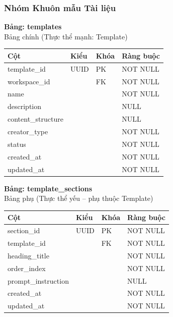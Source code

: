 \subsubsection{Nhóm Khuôn mẫu Tài liệu}

\textbf{Bảng: templates}\\
Bảng chính (Thực thể mạnh: Template)
\begin{table}[H]
\centering
\begin{tabular}{|l|l|l|l|}
\hline
\textbf{Cột} & \textbf{Kiểu} & \textbf{Khóa} & \textbf{Ràng buộc} \\ \hline
template\_id & UUID & PK & NOT NULL \\ \hline
workspace\_id & & FK & NOT NULL \\ \hline
name & & & NOT NULL \\ \hline
description & & & NULL \\ \hline
content\_structure & & & NULL \\ \hline
creator\_type & & & NOT NULL \\ \hline
status & & & NOT NULL \\ \hline
created\_at & & & NOT NULL \\ \hline
updated\_at & & & NOT NULL \\ \hline
\end{tabular}
\end{table}

\textbf{Bảng: template\_sections}\\
Bảng phụ (Thực thể yếu – phụ thuộc Template)
\begin{table}[H]
\centering
\begin{tabular}{|l|l|l|l|}
\hline
\textbf{Cột} & \textbf{Kiểu} & \textbf{Khóa} & \textbf{Ràng buộc} \\ \hline
section\_id & UUID & PK & NOT NULL \\ \hline
template\_id & & FK & NOT NULL \\ \hline
heading\_title & & & NOT NULL \\ \hline
order\_index & & & NOT NULL \\ \hline
prompt\_instruction & & & NULL \\ \hline
created\_at & & & NOT NULL \\ \hline
updated\_at & & & NOT NULL \\ \hline
\end{tabular}
\end{table}

